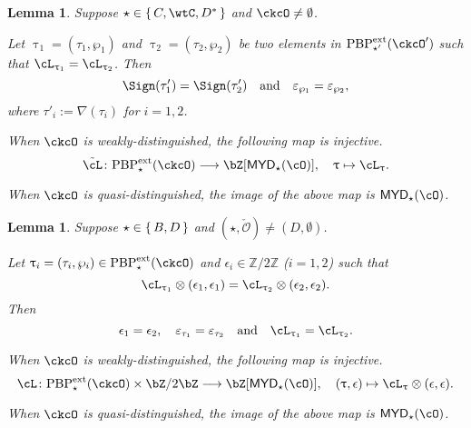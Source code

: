 \documentclass[12pt,a4paper]{amsart}
\newcommand{\AC}{\mathrm{AC}}
\def\MYD{{\mathsf{MYD}}}
\newcommand{\CO}{{\mathcal {O}}}
\newcommand{\Z}{\mathbb{Z}}
\def\DD{\nabla}
\numberwithin{equation}{section}
\newtheorem{lem}[thm]{Lemma}
\theoremstyle{remark}
\def\PBPe{\mathrm{PBP}^{\mathrm{ext}}}
\def\PBPes{\mathrm{PBP}^{\mathrm{ext}}_{\star}}
\def\PBPesp{\mathrm{PBP}^{\mathrm{ext}}_{\star'}}
\def\ckcOp{\ckcO^{\prime}}
\def\cOp{\cO^{\prime}}
\begin{document}
\begin{lem}\label{lem:C}
Suppose $\star \in \set{C,\wtC,D^{*}}$ and $\ckcO\neq \emptyset$.
  \begin{enuma}
    \item Let $\uptau_{1} = (\tau_{1},\wp_{1})$ and $\uptau_{2}=(\tau_{2},\wp_{2})$ be two elements in
    $\PBPesp(\ckcOp)$ such that $\ac_{\uptau_{1}} =  \ac_{\uptau_{2}}$.
    Then
    \[\Sign(\tau'_{1})=\Sign(\tau'_{2}) \quad \text{and} \quad \varepsilon_{\wp_{1}}=\varepsilon_{\wp_{2}},
    \]
    where $\tau'_{i} := \DD(\tau_{i})$ for $i=1,2$.
    \item When $\ckcO$ is weakly-distinguished, the following map is injective.
    \[
      \acme \colon
      \PBPes( \ckcO )\longrightarrow \bZ[\MYD_{\star}(\cO)],
      \quad \uptau\mapsto \ac_{\uptau}.
    \]
    \item When $\ckcO$ is quasi-distinguished, the image of the above map is $\MYD_{\star}(\cO)$.
  \end{enuma}
\end{lem}


\begin{lem}\label{lem:BD}
Suppose $\star \in \set{B,D}$ and $(\star, \check \CO)\neq (D, \emptyset)$.
  \begin{enuma}
  \item Let $\uptau_i=(\tau_i, \wp_i)\in \PBPe_\star(\ckcO)$ and
  $\epsilon_i\in \Z/2\Z$ ($i=1,2$) such that
  \[
    \ac_{\uptau_1}\lotimes (\epsilon_{1},\epsilon_{1})= \ac_{\uptau_2}\lotimes( \epsilon_{2},\epsilon_{2} ).
  \]
  Then
  \[
    \epsilon_1=\epsilon_2,\quad \varepsilon_{\tau_1}=\varepsilon_{\tau_2} \AND \ac_{\uptau_{1}}=\ac_{\uptau_{2}}.
  \]

  \item When $\ckcO$ is weakly-distinguished, the following map is injective.
  \[
    \acm \colon
    \PBPes( \ckcO )\times \bZ/2\bZ \longrightarrow \bZ[\MYD_{\star}(\cO)],\quad
    (\uptau,\epsilon) \mapsto \ac_{\uptau}\otimes (\epsilon, \epsilon).
  \]
  \item When $\ckcO$ is quasi-distinguished, the image of the above map is $\MYD_{\star}(\cO)$.
\end{enuma}
\end{lem}
\end{document}

